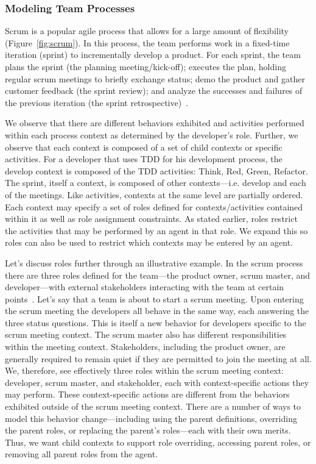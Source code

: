 \subsubsection{Modeling Team Processes}
Scrum is a popular agile process that allows for a large amount of flexibility
(Figure~\ref{fig:scrum}).  In this process, the team performs work in a
fixed-time iteration (sprint) to incrementally develop a product.  For each
sprint, the team plans the sprint (the planning meeting/kick-off); executes the
plan, holding regular scrum meetings to briefly exchange status; demo the
product and gather customer feedback (the sprint review); and analyze the
successes and failures of the previous iteration (the sprint
retrospective)~\cite{rubin_essential_2012}.

We observe that there are different behaviors exhibited and activities performed
within each process context as determined by the developer's role.  Further, we
observe that each context is composed of a set of child contexts or specific
activities.  For a developer that uses TDD for his development process, the
develop context is composed of the TDD activities: Think, Red, Green, Refactor.
The sprint, itself a context, is composed of other contexts---i.e.
develop and each of the meetings.  Like activities, contexts at the same level
are partially ordered.
Each context may specify a set of roles defined for contexts/activities
contained within it as well as role assignment constraints.  As stated earlier,
roles restrict the activities that may be performed by an agent in that role.
We expand this so roles can also be used to restrict which contexts may be
entered by an agent.

Let's discuss roles further through an illustrative example.  In the scrum
process there are three roles defined for the team---the product owner, scrum
master, and developer---with external stakeholders interacting with the team at
certain points~\cite{rubin_essential_2012}.
Let's say that a team is about to start a scrum meeting.  Upon entering the
scrum meeting the developers all behave in the same way, each answering the
three status questions.  This is itself a new behavior for developers specific
to the scrum meeting context.  The scrum master also has different
responsibilities within the meeting context.
Stakeholders, including the product owner, are generally required to remain
quiet if they are permitted to join the meeting at all.
We, therefore, see effectively three roles within the scrum meeting context:
developer, scrum master, and stakeholder, each with context-specific actions
they may perform.  These context-specific actions are different from the
behaviors exhibited outside of the scrum meeting context.  There are a number of
ways to model this behavior change---including using the parent definitions,
overriding the parent roles, or replacing the parent's roles---each with their own merits. 
Thus, we want child contexts to support role overriding, accessing parent roles,
or removing all parent roles from the agent.

